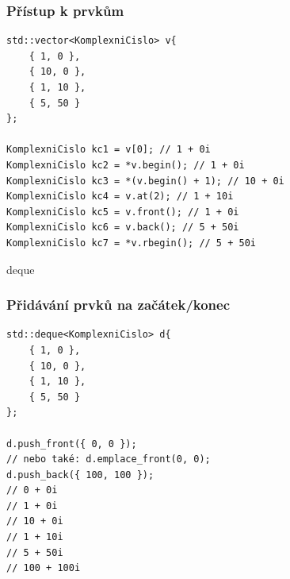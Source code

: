 \begin{frame}[fragile]
\frametitle{Přístup k prvkům}
\begin{yesblock}
\begin{lstlisting}
std::vector<KomplexniCislo> v{
	{ 1, 0 },
	{ 10, 0 },
	{ 1, 10 },
	{ 5, 50 }
};

KomplexniCislo kc1 = v[0]; // 1 + 0i
KomplexniCislo kc2 = *v.begin(); // 1 + 0i
KomplexniCislo kc3 = *(v.begin() + 1); // 10 + 0i
KomplexniCislo kc4 = v.at(2); // 1 + 10i
KomplexniCislo kc5 = v.front(); // 1 + 0i
KomplexniCislo kc6 = v.back(); // 5 + 50i
KomplexniCislo kc7 = *v.rbegin(); // 5 + 50i
\end{lstlisting}
\end{yesblock}
\end{frame}







\begin{frame}[fragile]
\begin{block}{deque}
\end{block}
\end{frame}


\begin{frame}[fragile]
\frametitle{Přidávání prvků na začátek/konec}
\begin{yesblock}
\begin{lstlisting}
std::deque<KomplexniCislo> d{
	{ 1, 0 },
	{ 10, 0 },
	{ 1, 10 },
	{ 5, 50 }
};

d.push_front({ 0, 0 });
// nebo také: d.emplace_front(0, 0);
d.push_back({ 100, 100 });
// 0 + 0i
// 1 + 0i
// 10 + 0i
// 1 + 10i 
// 5 + 50i
// 100 + 100i
\end{lstlisting}
\end{yesblock}
\end{frame}











